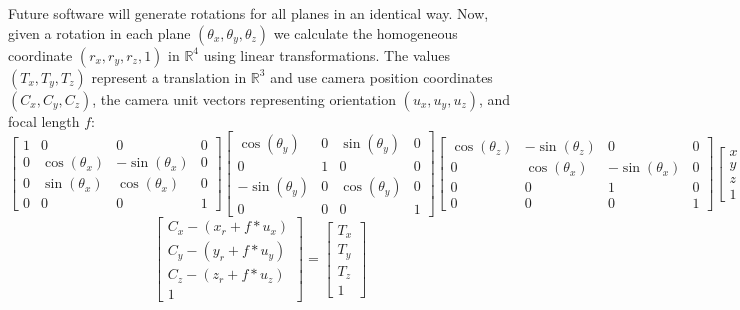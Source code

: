 Future software will generate rotations for all planes in an identical way.
Now, given a rotation in each plane $(\theta_x,\theta_y,\theta_z)$ we calculate the homogeneous
coordinate $(r_x,r_y,r_z, 1)$ in $\mathbb{R}^{4}$ using linear transformations.
The values $(T_x,T_y,T_z)$ represent a translation in $\mathbb{R}^{3}$ and use camera
position coordinates $(C_x,C_y,C_z)$, the camera unit vectors
representing orientation $(u_x,u_y,u_z)$, and focal length $f$:
\[
\begin{bmatrix}
  1 & 0 & 0 & 0\\
  0 & \cos(\theta_x) & -\sin(\theta_x) & 0\\
  0 & \sin(\theta_x) & \cos(\theta_x) & 0\\
  0 & 0 & 0 & 1
\end{bmatrix}
\begin{bmatrix}
  \cos(\theta_y) & 0 & \sin(\theta_y) & 0\\
  0 & 1 & 0 & 0\\
  -\sin(\theta_y) & 0 & \cos(\theta_y) & 0\\
  0 & 0 & 0 & 1
\end{bmatrix}
\begin{bmatrix}
  \cos(\theta_z) & -\sin(\theta_z) & 0 & 0\\
  0 & \cos(\theta_x) & -\sin(\theta_x) & 0\\
  0 & 0 & 1 & 0\\
  0 & 0 & 0 & 1
\end{bmatrix}
\begin{bmatrix}
  x\\
  y\\
  z\\
  1
\end{bmatrix}
=
\begin{bmatrix}
  x_r\\
  y_r\\
  z_r\\
  1
\end{bmatrix}
\]
\[
\begin{bmatrix}
  C_x - (x_r + f * u_x)\\
  C_y - (y_r + f * u_y)\\
  C_z - (z_r + f * u_z)\\
  1
\end{bmatrix}
=
\begin{bmatrix}
  T_x\\
  T_y\\
  T_z\\
  1
\end{bmatrix}
\]
